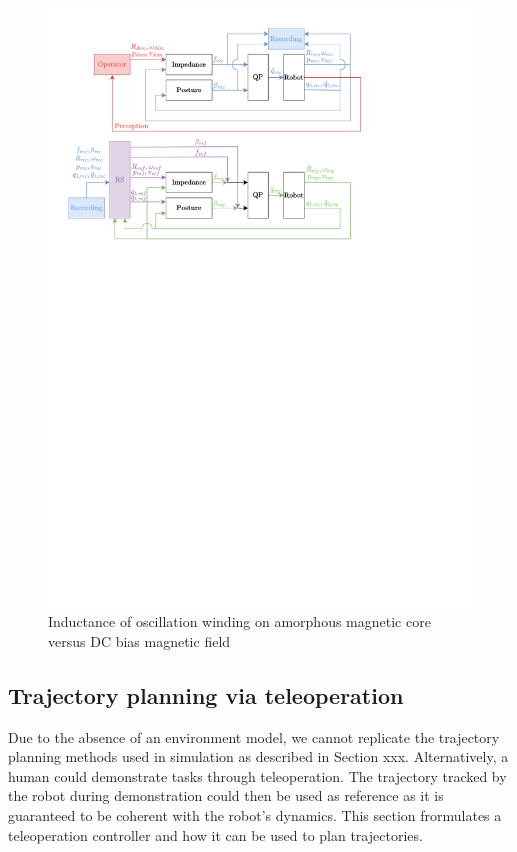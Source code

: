\documentclass[a4paper, 10pt, conference]{ieeeconf}
\begin{document}
\begin{figure}[h]
    \includegraphics[trim={1cm 17.8cm 5cm 6.5cm}, clip]{Graphics/qp.pdf}
      \caption{Inductance of oscillation winding on amorphous
       magnetic core versus DC bias magnetic field}
      \label{figurelabel}
   \end{figure}

    \subsection{Trajectory planning via teleoperation}
    Due to the absence of an environment model, we cannot replicate the trajectory planning methods used in simulation as described in Section xxx. Alternatively, a human could demonstrate tasks through teleoperation. The trajectory tracked by the robot during demonstration could then be used as reference as it is guaranteed to be coherent with the robot's dynamics. This section frormulates a teleoperation controller and how it can be used to plan trajectories.
\end{document}
